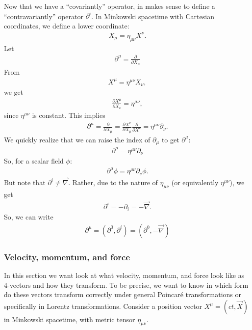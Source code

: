 \documentclass{article}
\theoremstyle{definition}
\begin{document}
Now that we have a ``covariantly'' operator, in makes sense to define a ``contravariantly'' operator $\partial^i$. In Minkowski spacetime with Cartesian coordinates, we define a lower coordinate:
\begin{align*}
X_\mu = \eta_{\mu\nu}X^\nu.
\end{align*}
Let
\begin{align*}
\boxed{\partial^\mu = \frac{\partial }{\partial X_\mu}}
\end{align*}
From
\begin{align*}
X^\mu = \eta^{\mu\nu}X_\nu,
\end{align*}
we get
\begin{align*}
\frac{\partial X^\mu}{\partial X_\nu} = \eta^{\mu\nu},
\end{align*}
since $\eta^{\mu\nu}$ is constant. This implies
\begin{align*}
\partial^\mu = \frac{\partial}{\partial X_\mu} = \frac{\partial X^\nu}{\partial X_\mu}\frac{\partial }{\partial X^\nu} = \eta^{\mu\nu}\partial_\nu.
\end{align*}
We quickly realize that we can raise the index of $\partial_\mu$ to get $\partial^\mu$:
\begin{align*}
\boxed{\partial^\mu = \eta^{\mu\nu}\partial_\nu}
\end{align*}
So, for a scalar field $\phi$:
\begin{align*}
\partial^\mu \phi = \eta^{\mu\nu}\partial_\nu \phi.
\end{align*}
But note that $\partial^i \neq \vec{\nabla}$. Rather, due to the nature of $\eta_{\mu\nu}$ (or equivalently $\eta^{\mu\nu}$), we get
\begin{align*}
\partial^i = -\partial_i = -\vec{\nabla}.
\end{align*}
So, we can write
\begin{align*}
\boxed{\partial^\mu = \left(\partial^0, \partial^i\right) = \left(\partial^0, -\vec{\nabla}\right)}
\end{align*}

\subsubsection{Velocity, momentum, and force}
In this section we want look at what velocity, momentum, and force look like as 4-vectors and how they transform. To be precise, we want to know in which form do these vectors transform correctly under general Poincar\'e transformations or specifically in Lorentz transformations. Consider a position vector $X^\mu = (ct, \vec{X})$ in Minkowski spacetime, with metric tensor $\eta_{\mu\nu}$.\\
\end{document}
